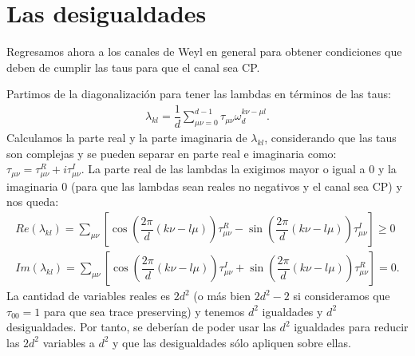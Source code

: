 \begin{figure}
    \qquad
\end{figure}
\newpage

\section{Las desigualdades}

Regresamos ahora a los canales de Weyl en general para obtener 
condiciones que deben de cumplir las taus para que
el canal sea CP. 

Partimos de la diagonalización para tener las lambdas en términos de las taus:
\begin{align*}
\lambda_{kl} = \dfrac{1}{d} \sum_{\mu\nu=0}^{d-1} \tau_{\mu\nu} \omega_d^{k\nu - \mu l}.
\end{align*}
Calculamos la parte real y la parte imaginaria de $\lambda_{kl}$,
considerando que las taus son complejas y se pueden separar en 
parte real e imaginaria como: $\tau_{\mu\nu} = \tau_{\mu\nu}^R + i \tau_{\mu\nu}^I$. 
La parte real de las lambdas la exigimos mayor o igual a $0$
 y la imaginaria 0 (para que las lambdas sean reales no negativos 
y el canal sea CP) y nos queda:
\begin{align}
Re(\lambda_{kl}) =  \sum_{\mu \nu} \left[ \cos \left( \dfrac{2\pi}{d}(k\nu-l\mu) \right) \tau_{\mu \nu}^R -\sin \left( \dfrac{2\pi}{d}(k\nu-l\mu) \right) \tau_{\mu \nu}^I \right] \geq 0 \label{desigualdades} \\
Im(\lambda_{kl}) = \sum_{\mu \nu} \left[ \cos \left( \dfrac{2\pi}{d}(k\nu-l\mu) \right) \tau_{\mu \nu}^I +\sin \left( \dfrac{2\pi}{d}(k\nu-l\mu) \right) \tau_{\mu \nu}^R \right] = 0.  \label{igualdades}
\end{align}
La cantidad de variables reales es $2d^2$ 
(o más bien $2d^2 - 2$ si consideramos que $\tau_{00} = 1$ para que sea trace
preserving) y tenemos $d^2$ igualdades
y $d^2$ desigualdades. Por tanto, se deberían de poder usar las $d^2$ 
igualdades para reducir las $2d^2$
variables a $d^2$ y que las desigualdades sólo apliquen sobre ellas.

